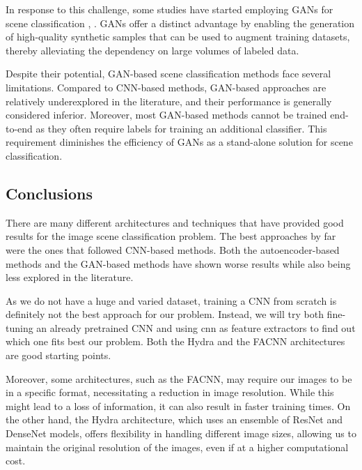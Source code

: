 In response to this challenge, some studies have started employing GANs for scene classification
\cite{attgan}, \cite{martagan}. GANs offer a distinct advantage by enabling the generation of
high-quality synthetic samples that can be used to augment training datasets, thereby alleviating
the dependency on large volumes of labeled data.

Despite their potential, GAN-based scene classification methods face several limitations. Compared to
CNN-based methods, GAN-based approaches are relatively underexplored in the literature, and their
performance is generally considered inferior. Moreover, most GAN-based methods cannot be trained
end-to-end as they often require labels for training an additional classifier. This requirement
diminishes the efficiency of GANs as a stand-alone solution for scene classification.

\subsection{Conclusions}
There are many different architectures and techniques that have provided good results
for the image scene classification problem. The best approaches by far were the ones
that followed CNN-based methods. Both the autoencoder-based methods and the GAN-based
methods have shown worse results while also being less explored in the literature.

As we do not have a huge and varied dataset, training a CNN from scratch is definitely
not the best approach for our problem. Instead, we will try both fine-tuning an already
pretrained CNN and using \gls{cnn} as feature extractors to find out which one fits best
our problem. Both the Hydra and the FACNN architectures are good starting points.

Moreover, some architectures, such as the FACNN, may require our images to be in a specific
format, necessitating a reduction in image resolution. While this might lead to a loss of
information, it can also result in faster training times. On the other hand, the Hydra
architecture, which uses an ensemble of ResNet and DenseNet models, offers flexibility
in handling different image sizes, allowing us to maintain the original resolution of the
images, even if at a higher computational cost.
